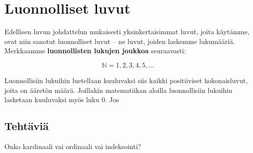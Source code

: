 \chapter{Luonnolliset luvut}

Edellisen luvun johdattelun mukaisesti yksinkertaisimmat luvut, joita käytämme, ovat niin sanotut luonnolliset luvut – ne luvut, joiden laskemme lukumääriä. Merkkaamme \textbf{luonnollisten lukujen joukkoa} seuraavasti:

\[\mathbb{N}={1, 2, 3, 4, 5, ...}\]

Luonnollisiin lukuihin luetellaan kuuluvaksi siis kaikki positiiviset kokonaisluvut, joita on ääretön määrä. Joillakin matematiikan aloilla luonnollisiin lukuihin lasketaan kuuluvaksi myös luku $0$. Jos 





\section{Tehtäviä}

\begin{tehtava}

Onko kardinaali vai ordinaali vai indeksointi?

\end{tehtava}
